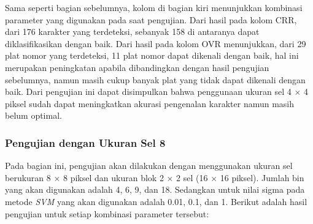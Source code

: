 \noindent Sama seperti bagian sebelumnya, kolom di bagian kiri menunjukkan kombinasi parameter yang digunakan pada saat pengujian. Dari hasil pada kolom CRR, dari 176 karakter yang terdeteksi, sebanyak 158 di antaranya dapat diklasifikasikan dengan baik. Dari hasil pada kolom OVR menunjukkan, dari 29 plat nomor yang terdeteksi, 11 plat nomor dapat dikenali dengan baik, hal ini merupakan peningkatan apabila dibandingkan dengan hasil pengujian sebelumnya, namun masih cukup banyak plat yang tidak dapat dikenali dengan baik. Dari pengujian ini dapat  disimpulkan bahwa penggunaan ukuran sel 4 $\times$ 4 piksel sudah dapat meningkatkan akurasi pengenalan karakter namun masih belum optimal.\\
\subsubsection{Pengujian dengan Ukuran Sel 8}
\noindent Pada bagian ini, pengujian akan dilakukan dengan menggunakan ukuran sel berukuran 8 $\times$ 8 piksel dan ukuran blok 2 $\times$ 2 sel (16 $\times$ 16 piksel). Jumlah bin yang akan digunakan adalah 4, 6, 9, dan 18. Sedangkan untuk nilai sigma pada metode \textit{SVM} yang akan digunakan adalah 0.01, 0.1, dan 1. Berikut adalah hasil pengujian untuk setiap kombinasi parameter tersebut:
